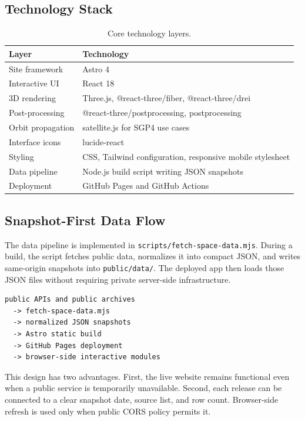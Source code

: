 \documentclass[11pt,a4paper]{article}
\begin{document}
\subsection{Technology Stack}

\begin{table}[h]
\centering
\caption{Core technology layers.}
\begin{tabular}{ll}
\toprule
\textbf{Layer} & \textbf{Technology}\\
\midrule
Site framework & Astro 4\\
Interactive UI & React 18\\
3D rendering & Three.js, @react-three/fiber, @react-three/drei\\
Post-processing & @react-three/postprocessing, postprocessing\\
Orbit propagation & satellite.js for SGP4 use cases\\
Interface icons & lucide-react\\
Styling & CSS, Tailwind configuration, responsive mobile stylesheet\\
Data pipeline & Node.js build script writing JSON snapshots\\
Deployment & GitHub Pages and GitHub Actions\\
\bottomrule
\end{tabular}
\end{table}

\subsection{Snapshot-First Data Flow}

The data pipeline is implemented in \texttt{scripts/fetch-space-data.mjs}. During a build, the script fetches public data, normalizes it into compact JSON, and writes same-origin snapshots into \texttt{public/data/}. The deployed app then loads those JSON files without requiring private server-side infrastructure.

\begin{lstlisting}[style=astrobis,caption={Simplified build-time data flow.}]
public APIs and public archives
  -> fetch-space-data.mjs
  -> normalized JSON snapshots
  -> Astro static build
  -> GitHub Pages deployment
  -> browser-side interactive modules
\end{lstlisting}

This design has two advantages. First, the live website remains functional even when a public service is temporarily unavailable. Second, each release can be connected to a clear snapshot date, source list, and row count. Browser-side refresh is used only when public CORS policy permits it.
\end{document}

